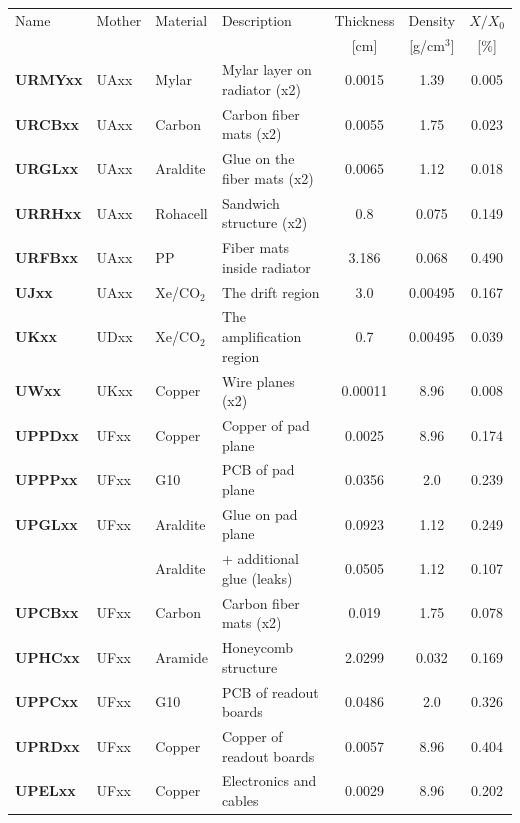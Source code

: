 \documentclass{alicetdr}
\begin{document}
\begin{center}
\begin{tabular}{l|l|l|l|c|c|c}
Name         & Mother & Material    & Description                  & Thickness & Density      & $X/X_{0}$ \\
             &        &             &                              & [cm]      & [g/cm$^{3}$] & [\%]      \\ \hline
{\bf URMYxx} & UAxx   & Mylar       & Mylar layer on radiator (x2) & 0.0015    & 1.39         & 0.005     \\
{\bf URCBxx} & UAxx   & Carbon      & Carbon fiber mats (x2)       & 0.0055    & 1.75         & 0.023     \\
{\bf URGLxx} & UAxx   & Araldite    & Glue on the fiber mats (x2)  & 0.0065    & 1.12         & 0.018     \\
{\bf URRHxx} & UAxx   & Rohacell    & Sandwich structure (x2)      & 0.8       & 0.075        & 0.149     \\
{\bf URFBxx} & UAxx   & PP          & Fiber mats inside radiator   & 3.186     & 0.068        & 0.490     \\ \hline
{\bf UJxx}   & UAxx   & Xe/CO$_{2}$ & The drift region             & 3.0       & 0.00495      & 0.167     \\
{\bf UKxx}   & UDxx   & Xe/CO$_{2}$ & The amplification region     & 0.7       & 0.00495      & 0.039     \\
{\bf UWxx}   & UKxx   & Copper      & Wire planes (x2)             & 0.00011   & 8.96         & 0.008     \\ \hline
{\bf UPPDxx} & UFxx   & Copper      & Copper of pad plane          & 0.0025    & 8.96         & 0.174     \\
{\bf UPPPxx} & UFxx   & G10         & PCB of pad plane             & 0.0356    & 2.0          & 0.239     \\
{\bf UPGLxx} & UFxx   & Araldite    & Glue on pad plane            & 0.0923    & 1.12         & 0.249     \\
             &        & Araldite    & + additional glue (leaks)    & 0.0505    & 1.12         & 0.107     \\
{\bf UPCBxx} & UFxx   & Carbon      & Carbon fiber mats (x2)       & 0.019     & 1.75         & 0.078     \\
{\bf UPHCxx} & UFxx   & Aramide     & Honeycomb structure          & 2.0299    & 0.032        & 0.169     \\
{\bf UPPCxx} & UFxx   & G10         & PCB of readout boards        & 0.0486    & 2.0          & 0.326     \\
{\bf UPRDxx} & UFxx   & Copper      & Copper of readout boards     & 0.0057    & 8.96         & 0.404     \\
{\bf UPELxx} & UFxx   & Copper      & Electronics and cables       & 0.0029    & 8.96         & 0.202     \\
\end{tabular}
\end{center}
\end{document}
